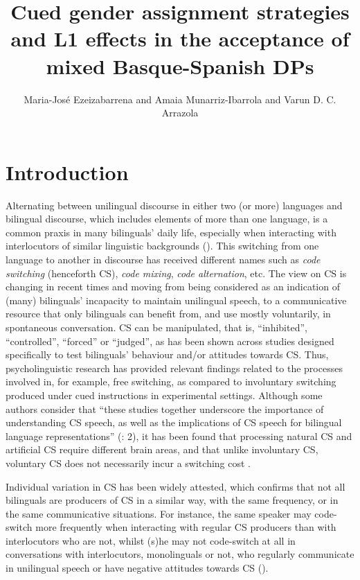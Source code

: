 \documentclass[output=paper]{langscibook}
\author{Maria-José Ezeizabarrena\orcid{}\affiliation{University of the Basque Country (UPV/EHU), Spain, ELEBILAB Research group} and Amaia Munarriz-Ibarrola\orcid{}\affiliation{University of the Basque Country (UPV/EHU), Spain, ELEBILAB Research group} and Varun D. C. Arrazola\orcid{}\affiliation{CNRS-IKER (UMR 5478), France}}
\title[Cued GAS and L1 effects in the acceptance of mixed Basque-Spanish DPs]{Cued gender assignment strategies and L1 effects in the acceptance of mixed Basque-Spanish DPs}
\begin{document}
\maketitle 

\section{Introduction }\label{sec:ezeiza:1}

Alternating between unilingual discourse in either two (or more) languages and bilingual discourse, which includes elements of more than one language, is a common praxis in many bilinguals’ daily life, {especially when interacting with interlocutors of similar linguistic backgrounds} {(\citealt{BullockToribio2009})}{. This switching from one language to another in discourse has received different names such as} {\textit{code switching}} {(henceforth CS),} {\textit{code mixing}}, {\textit{code alternation}}{, etc. The view on CS is changing in recent times and moving from being considered as an indication of (many) bilinguals’ incapacity to maintain unilingual speech, to a communicative resource that only bilinguals can benefit from, and use mostly voluntarily, in spontaneous conversation. CS can be manipulated, that is, “inhibited”, “controlled”, “forced” or “judged”, as has been shown across studies designed specifically to test bilinguals’ behaviour and/or attitudes towards CS. Thus, psycholinguistic research has provided relevant findings related to the processes involved in, for example, free switching, as compared to involuntary switching produced under cued instructions in experimental settings. Although some authors consider that “these studies together underscore the importance of understanding CS speech, as well as the implications of CS speech for bilingual language representations”} {(\citealt{XuEtAl2021}: 2)}{, it has been found that processing natural CS and artificial CS require different brain areas, and that unlike involuntary CS, voluntary CS does not necessarily incur a switching cost} {\citep{Blanco-ElorrietaEtAl2018}}.

 {Individual variation in CS has been widely attested, which confirms that not all bilinguals are producers of CS in a similar way, with the same frequency, or in the same communicative situations. For instance, the same speaker may code-switch more frequently when interacting with regular CS producers than with interlocutors who are not, whilst (s)he may not code-switch at all in conversations with interlocutors, monolinguals or not, who regularly communicate in unilingual speech or have negative attitudes towards CS} (\citealt{BlokzijlEtAl2017, Lipski2016,ParafitaCoutoEtAl2015welsh}).
\end{document}

